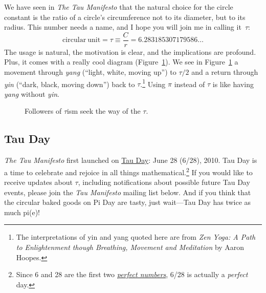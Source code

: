 We have seen in \emph{The Tau Manifesto} that the natural choice for the circle constant is the ratio of a circle's circumference not to its diameter, but to its radius. This number needs a name, and I hope you will join me in calling it~$\tau$:
\[
  \mathrm{circular\ unit} = \tau \equiv \frac{C}{r} = 6.283185307179586\ldots
\]
The usage is natural, the motivation is clear, and the implications are profound. Plus, it comes with a really cool diagram (Figure~\ref{fig:tauism}). We see in Figure~\ref{fig:tauism} a movement through \emph{yang} (``light, white, moving up'') to $\tau/2$ and a return through \emph{yin} (``dark, black, moving down'') back to $\tau$.\footnote{The interpretations of yin and yang quoted here are from \emph{Zen Yoga: A Path to Enlightenment though Breathing, Movement and Meditation} by Aaron Hoopes.} Using $\pi$ instead of $\tau$ is like having \emph{yang} without \emph{yin}.

\begin{figure}
\begin{center}
\end{center}
\caption{Followers of $\tau$ism seek the way of the $\tau$.\label{fig:tauism}}
\end{figure}



  \subsection{Tau Day} %
  \label{sec:tau_day}

\emph{The Tau Manifesto} first launched on \href{http://tauday.com/}{Tau Day}: June 28 (6/28), 2010. Tau Day is a time to celebrate and rejoice in all things mathematical.\footnote{Since 6 and 28 are the first two \href{http://en.wikipedia.org/wiki/Perfect_number}{\emph{perfect numbers}}, 6/28 is actually a \emph{perfect} day.} If you would like to receive updates about $\tau$, including notifications about possible future Tau Day events, please join the \emph{Tau Manifesto} mailing list below. And if you think that the circular baked goods on Pi Day are tasty, just wait---Tau Day has twice as much pi(e)!

